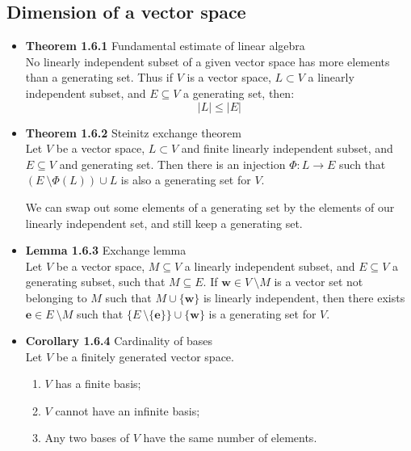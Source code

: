 \documentclass[11pt,a4paper]{article}
\begin{document}
\subsection{Dimension of a vector space}

\begin{itemize}

    \item \textbf{Theorem 1.6.1} Fundamental estimate of linear algebra \\
        No linearly independent subset of a given vector space has more elements than a
        generating set.
        Thus if $V$ is a vector space, $L \subset V$ a linearly independent subset,
        and $E \subseteq V$ a generating set, then:
        \[
            |L| \leq |E|
        \]

    \item \textbf{Theorem 1.6.2} Steinitz exchange theorem \\
        Let $V$ be a vector space, $L \subset V$ and finite linearly independent subset,
        and $E \subseteq V$ and generating set.
        Then there is an injection $\Phi : L \to E$ such that
        $(E \ \setminus \Phi(L)) \cup L$ is also a generating set for $V$.

        We can swap out some elements of a generating set by the elements of our linearly
        independent set, and still keep a generating set.

    \item \textbf{Lemma 1.6.3} Exchange lemma \\
        Let $V$ be a vector space, $M \subseteq V$ a linearly independent subset,
        and $E \subseteq V$ a generating subset, such that $M \subseteq E$.
        If $\mathbf{w} \in V \ \setminus M$ is a vector set not belonging to $M$ such that
        $M \cup \{\mathbf{w}\}$ is linearly independent, then there exists
        $\mathbf{e} \in E \ \setminus M$ such that
        $\{E \ \setminus \{\mathbf{e}\}\} \cup \{\mathbf{w} \}$ is a generating set for $V$.

    \item \textbf{Corollary 1.6.4} Cardinality of bases \\
        Let $V$ be a finitely generated vector space.
        \begin{enumerate}
            \item $V$ has a finite basis;
            \item $V$ cannot have an infinite basis;
            \item Any two bases of $V$ have the same number of elements.
        \end{enumerate}


\end{itemize}
\end{document}
